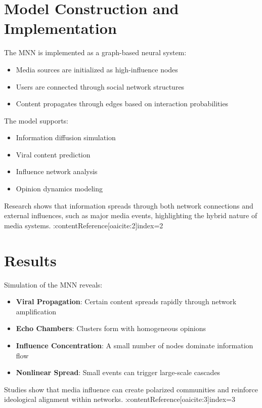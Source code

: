 \documentclass[12pt]{article}
\begin{document}
\section{Model Construction and Implementation}

The MNN is implemented as a graph-based neural system:

\begin{itemize}
\item Media sources are initialized as high-influence nodes
\item Users are connected through social network structures
\item Content propagates through edges based on interaction probabilities
\end{itemize}

The model supports:

\begin{itemize}
\item Information diffusion simulation
\item Viral content prediction
\item Influence network analysis
\item Opinion dynamics modeling
\end{itemize}

Research shows that information spreads through both network connections and external influences, such as major media events, highlighting the hybrid nature of media systems. :contentReference[oaicite:2]{index=2}  

\section{Results}

Simulation of the MNN reveals:

\begin{itemize}
\item \textbf{Viral Propagation}: Certain content spreads rapidly through network amplification
\item \textbf{Echo Chambers}: Clusters form with homogeneous opinions
\item \textbf{Influence Concentration}: A small number of nodes dominate information flow
\item \textbf{Nonlinear Spread}: Small events can trigger large-scale cascades
\end{itemize}

Studies show that media influence can create polarized communities and reinforce ideological alignment within networks. :contentReference[oaicite:3]{index=3}  
\end{document}
